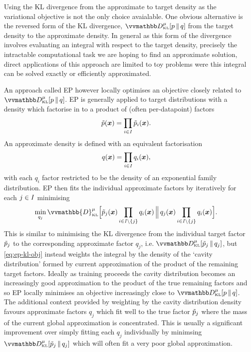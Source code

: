 Using the \ac{KL} divergence from the approximate to target density as the variational objective is not the only choice avaialable. One obvious alternative is the reversed form of the \ac{KL} divergence, $\kldiv[\mu]{\tgtdens}{q}$ from the target density to the approximate density. In general as this form of the divergence involves evaluating an integral with respect to the target density, precisely the intractable computational task we are hoping to find an approximate solution, direct applications of this approach are limited to toy problems were this integral can be solved exactly or efficiently approximated. 

An approach called \ac{EP} \citep{minka2001expectation} however locally optimises an objective closely related to $\kldiv[\mu]{\tgtdens}{q}$. \ac{EP} is generally applied to target distributions with a density which factorise in to a product of (often per-datapoint) factors
\begin{equation}\label{eq:ep-target-density-factorisation}
  \tilde{p}(\boldsymbol{x}) = \prod_{i\in\mathit{I}} \tilde{p}_i(\boldsymbol{x}).
\end{equation}
An approximate density is defined with an equivalent factorisation
\begin{equation}\label{eq:ep-approximate-density-factorisation}
  q(\boldsymbol{x}) = \prod_{i\in\mathit{I}} q_i(\boldsymbol{x}),
\end{equation}
with each $q_i$ factor restricted to be the density of an exponential family distribution. \ac{EP} then fits the individual approximate factors by iteratively for each $j \in \mathit{I}$ minimising
\begin{equation}\label{eq:ep-kl-obj}
  \min_{q_j} \vvmathbb{D}_{\scriptscriptstyle\mathrm{KL}}^{\mu}
  \Big[
    {\utgtdens_j(\vct{x}) \prod_{i\in\set{I} \setminus \fset{j}} q_i(\vct{x})}
  \,\Big\Vert\,
    {q_j(\vct{x}) \prod_{i\in\set{I} \setminus \fset{j}} q_i(\vct{x})}
  \Big].
\end{equation}
This is similar to minimising the \ac{KL} divergence from the individual target factor $\tilde{p}_j$ to the corresponding approximate factor $q_j$, i.e. $\kldiv[\mu]{\utgtdens_j}{q_j}$, but \eqref{eq:ep-kl-obj} instead weights the integral by the density of the `cavity distribution' formed by current approximation of the product of the remaining target factors. Ideally as training proceeds the cavity distribution becomes an increasingly good approximation to the product of the true remaining factors and so \ac{EP} locally minimises an objective increasingly close to $\kldiv[\mu]{\tgtdens}{q}$. The additional context provided by weighting by the cavity distribution density favours approximate factors $q_j$ which fit well to the true factor $\tilde{p}_j$ where the mass of the current global approximation is concentrated. This is usually a significant improvement over simply fitting each $q_j$ individually by minimsing $\kldiv[\mu]{\utgtdens_j}{q_j}$ which will often fit a very poor global approximation.

